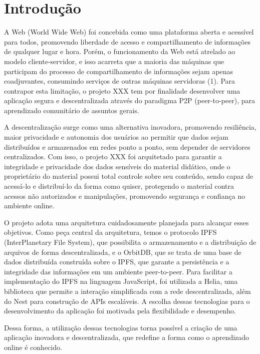\chapter[Introdução]{Introdução}

A Web (World Wide Web) foi concebida como uma plataforma aberta e acessível para todos, promovendo liberdade de acesso e compartilhamento de informações de qualquer lugar e hora. 
Porém, o funcionamento da Web está atrelado ao modelo cliente-servidor, e isso acarreta que a maioria das máquinas que participam do processo de compartilhamento de informações sejam apenas coadjuvantes, consumindo serviços de outras máquinas servidoras (1). Para contrapor esta limitação, o projeto XXX tem por finalidade desenvolver uma aplicação segura e descentralizada através do paradigma P2P (peer-to-peer), para aprendizado comunitário de assuntos gerais.

A descentralização surge como uma alternativa inovadora, promovendo resiliência, maior privacidade e autonomia dos usuários ao permitir que dados sejam distribuídos e armazenados em redes ponto a ponto, sem depender de servidores centralizados. Com isso, o projeto XXX foi arquitetado para garantir a integridade e privacidade dos dados sensíveis do material didático, onde o proprietário do material possui total controle sobre seu conteúdo, sendo capaz de acessá-lo e distribuí-lo da forma como quiser, protegendo o material contra acessos não autorizados e manipulações, promovendo segurança e confiança no ambiente online.

O projeto adota uma arquitetura cuidadosamente planejada para alcançar esses objetivos. Como peça central da arquitetura, temos o protocolo IPFS (InterPlanetary File System), que possibilita o armazenamento e a distribuição de arquivos de forma descentralizada, e o OrbitDB, que se trata de uma base de dados distribuída construída sobre o IPFS, que garante a persistência e a integridade das informações em um ambiente peer-to-peer. Para facilitar a implementação do IPFS na linguagem JavaScript, foi utilizada a Helia, uma biblioteca que permite a interação simplificada com a rede descentralizada, além do Nest para construção de APIs escaláveis. A escolha dessas tecnologias para o desenvolvimento da aplicação foi motivada pela flexibilidade e desempenho.

Dessa forma, a utilização dessas tecnologias torna possível a criação de uma aplicação inovadora e descentralizada, que redefine a forma como o aprendizado online é conhecido.

